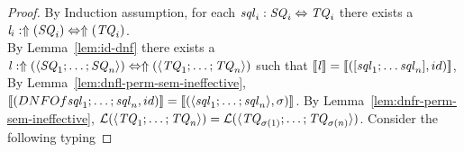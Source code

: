 \documentclass[numbers]{sigplanconf}
\begin{document}
\begin{lemma}
\begin{proof}
    By Induction assumption, for each $\mathit{sql}_i : \mathit{SQ}_i \Leftrightarrow \mathit{TQ}_i$ there exists a $\mathit{l}_i : \Uparrow(\mathit{SQ}_i) \Leftrightarrow \Uparrow(\mathit{TQ}_i)$.\\
    By Lemma~\ref{lem:id-dnf} there exists a $\mathit{l} : \Uparrow(\langle\mathit{SQ}_1;\ldots;\mathit{SQ}_{n}\rangle) \Leftrightarrow \Uparrow(\langle\mathit{TQ}_1;\ldots;\mathit{TQ}_{n}\rangle)$ such that $[ \! [\mathit{l}] \! ]=[ \! [([\mathit{sql}_1;\ldots\mathit{sql}_n],id)] \! ]$,
    By Lemma~\ref{lem:dnfl-perm-sem-ineffective},
    $[ \! [(DNFOf{\mathit{sql}_1;\ldots;\mathit{sql}_n},id)] \! ]=
    [ \! [(\langle\mathit{sql}_1;\ldots;\mathit{sql}_n\rangle,\sigma)] \! ]$.
    By Lemma~\ref{lem:dnfr-perm-sem-ineffective},
    $\mathcal{L}(\langle\mathit{TQ}_1;\ldots;\mathit{TQ}_n\rangle)=
    \mathcal{L}(\langle\mathit{TQ}_{\sigma(1)};\ldots;\mathit{TQ}_{\sigma(n)}\rangle)$.
    Consider the following typing


\end{proof}
\end{lemma}
\end{document}

